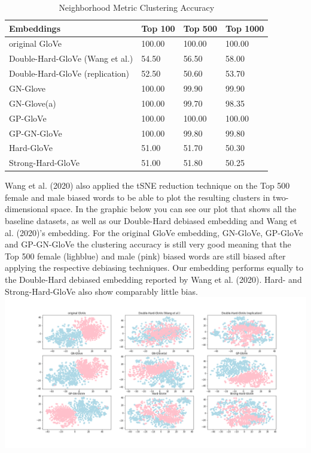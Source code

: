 \documentclass[
  english,
  man,floatsintext]{apa6}
\begin{document}
\begin{table}[tbp]

\begin{center}
\begin{threeparttable}

\caption{\label{tab:table 2}Neighborhood Metric Clustering Accuracy}

\begin{tabular}{llll}
\toprule
Embeddings & Top 100 & Top 500 & Top 1000\\
\midrule
original GloVe & 100.00 & 100.00 & 100.00\\
Double-Hard-GloVe (Wang et al.) & 54.50 & 56.50 & 58.00\\
Double-Hard-GloVe (replication) & 52.50 & 50.60 & 53.70\\
GN-Glove & 100.00 & 99.90 & 99.90\\
GN-Glove(a) & 100.00 & 99.70 & 98.35\\
GP-GloVe & 100.00 & 100.00 & 100.00\\
GP-GN-GloVe & 100.00 & 99.80 & 99.80\\
Hard-GloVe & 51.00 & 51.70 & 50.30\\
Strong-Hard-GloVe & 51.00 & 51.80 & 50.25\\
\bottomrule
\end{tabular}

\end{threeparttable}
\end{center}

\end{table}

Wang et al. (2020) also applied the tSNE reduction technique on the Top 500 female and male biased words to be able to plot the resulting clusters in two-dimensional space. In the graphic below you can see our plot that shows all the baseline datasets, as well as our Double-Hard debiased embedding and Wang et al. (2020)'s embedding. For the original GloVe embedding, GN-GloVe, GP-GloVe and GP-GN-GloVe the clustering accuracy is still very good meaning that the Top 500 female (lighblue) and male (pink) biased words are still biased after applying the respective debiasing techniques. Our embedding performs equally to the Double-Hard debiased embedding reported by Wang et al. (2020). Hard- and Strong-Hard-GloVe also show comparably little bias.
\includegraphics{evaluation_results/results_tsne.png}
\end{document}
